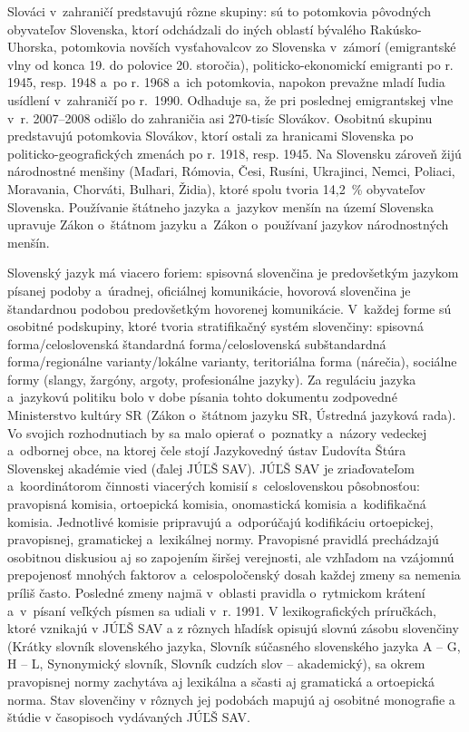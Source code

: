 \begin{multicols}{2}

Slováci v~zahraničí predstavujú rôzne skupiny: sú to potomkovia pôvodných obyvateľov Slovenska, ktorí odchádzali do iných oblastí bývalého Rakúsko-Uhorska, potomkovia novších vysťahovalcov zo Slovenska v~zámorí (emigrantské vlny od konca 19. do polovice 20. storočia), politicko-ekonomickí emigranti po r. 1945, resp. 1948 a~po r. 1968 a~ich potomkovia, napokon prevažne mladí ľudia usídlení v~zahraničí po r.~1990. Odhaduje sa, že pri poslednej emigrantskej vlne v~r. 2007–2008 odišlo do zahraničia asi 270-tisíc Slovákov. Osobitnú skupinu predstavujú potomkovia Slovákov, ktorí ostali za hranicami Slovenska po politicko-geografických zmenách po r. 1918, resp. 1945. Na Slovensku zároveň žijú národnostné menšiny (Maďari, Rómovia, Česi, Rusíni, Ukrajinci, Nemci, Poliaci, Moravania, Chorváti, Bulhari, Židia), ktoré spolu tvoria 14,2~\% obyvateľov Slovenska. Používanie štátneho jazyka a~jazykov menšín na území Slovenska upravuje Zákon o~štátnom jazyku a~Zákon o~používaní jazykov národnostných menšín.

Slovenský jazyk má viacero foriem: spisovná slovenčina je predovšetkým jazykom písanej podoby a~úradnej, oficiálnej komunikácie, hovorová slovenčina je štandardnou podobou predovšetkým hovorenej komunikácie. V~každej forme sú osobitné podskupiny, ktoré tvoria stratifikačný systém slovenčiny: spisovná forma/celoslovenská štandardná forma/celoslovenská subštandardná forma/regionálne varianty/lokálne varianty, teritoriálna forma (nárečia), sociálne formy (slangy, žargóny, argoty, profesionálne jazyky). Za reguláciu jazyka a~jazykovú politiku bolo v dobe písania tohto dokumentu zodpovedné Ministerstvo kultúry SR (Zákon o~štátnom jazyku SR, Ústredná jazyková rada). Vo svojich rozhodnutiach by sa malo opierať o~poznatky a~názory vedeckej a~odbornej obce, na ktorej čele stojí Jazykovedný ústav Ľudovíta Štúra Slovenskej akadémie vied (ďalej JÚĽŠ SAV).
JÚĽŠ SAV je zriaďovateľom a~koordinátorom činnosti viacerých komisií s~celoslovenskou pôsobnosťou: pravopisná komisia, ortoepická komisia, onomastická komisia a~kodifikačná komisia. Jednotlivé komisie pripravujú a~odporúčajú kodifikáciu ortoepickej, pravopisnej, gramatickej a~lexikálnej normy. Pravopisné pravidlá prechádzajú osobitnou diskusiou aj so zapojením širšej verejnosti, ale vzhľadom na vzájomnú prepojenosť mnohých faktorov a~celospoločenský dosah každej zmeny sa nemenia príliš často. Posledné zmeny najmä v~oblasti pravidla o~rytmickom krátení a~v~písaní veľkých písmen sa udiali v~r. 1991. V lexikografických príručkách, ktoré vznikajú v JÚĽŠ SAV a z rôznych hľadísk opisujú slovnú zásobu slovenčiny (Krátky slovník slovenského jazyka, Slovník súčasného slovenského jazyka A -- G, H -- L, Synonymický slovník, Slovník cudzích slov -- akademický\cite{kssj2003,sssj2006,sssj2011,sss2004,scs2005}), sa okrem pravopisnej normy zachytáva aj lexikálna a sčasti aj gramatická a ortoepická norma. Stav slovenčiny v rôznych jej podobách mapujú aj osobitné monografie a štúdie v časopisoch vydávaných JÚĽŠ SAV.


\end{multicols}
